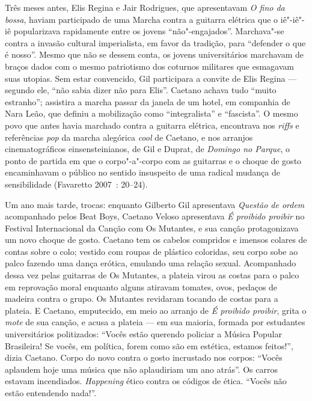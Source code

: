 Três meses antes, Elis Regina e Jair Rodrigues, que apresentavam \emph{O
fino da bossa}, haviam participado de uma Marcha contra a guitarra
elétrica que o iê"-iê"-iê popularizava rapidamente entre os jovens
``não"-engajados''. Marchava"-se contra a invasão cultural imperialista,
em favor da tradição, para ``defender o que é nosso''. Mesmo que não se
dessem conta, os jovens universitários marchavam de braços dados com o
mesmo patriotismo dos coturnos militares que esmagavam suas utopias. Sem
estar convencido, Gil participara a convite de Elis Regina --- segundo
ele, ``não sabia dizer não para Elis''. Caetano achava tudo ``muito
estranho''; assistira a marcha passar da janela de um hotel, em
companhia de Nara Leão, que definiu a mobilização como ``integralista''
e ``fascista''. O mesmo povo que antes havia marchado contra a guitarra
elétrica, encontrava nos \emph{riffs }e referências \emph{pop} da marcha
alegórica \emph{cool }de Caetano, e nos arranjos cinematográficos
einsensteinianos, de Gil e Duprat, de \emph{Domingo no Parque}, o
ponto de partida em que o corpo"-a"-corpo com as guitarras e o choque de
gosto encaminhavam o público no sentido insuspeito de uma radical
mudança de sensibilidade (Favaretto 2007~: 20--24).

Um ano mais tarde, trocas: enquanto Gilberto Gil apresentava
\emph{Questão de ordem }acompanhado pelos Beat Boys, Caetano\emph{
}Veloso apresentava \emph{É proibido proibir} no  Festival
Internacional da Canção com Os Mutantes, e sua canção protagonizava um
novo choque de gosto. Caetano tem os cabelos compridos e imensos colares
de contas sobre o colo; vestido com roupas de plástico coloridas, seu
corpo sobe ao palco fazendo uma dança erótica, emulando uma relação
sexual. Acompanhado dessa vez pelas guitarras de Os Mutantes, a plateia
virou as costas para o palco em reprovação moral enquanto alguns
atiravam tomates, ovos, pedaços de madeira contra o grupo. Os Mutantes
revidaram tocando de costas para a plateia. E Caetano, emputecido, em
meio ao arranjo de \emph{É proibido proibir}, grita o \emph{mote }de sua
canção, e acusa a plateia --- em sua maioria, formada por estudantes
universitários politizados: ``Vocês estão querendo policiar a Música
Popular Brasileira! Se vocês, em política, forem como são em estética,
estamos feitos!'', dizia Caetano. Corpo do novo contra o gosto
incrustado nos corpos: ``Vocês aplaudem hoje uma música que não
aplaudiriam um ano atrás''. Os carros estavam incendiados.
\emph{Happening }ético contra os códigos de ética. ``Vocês não estão
entendendo nada!''.

